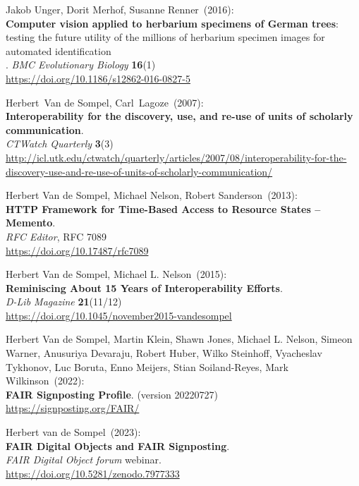 \begin{thebibliography}{9}
Jakob Unger, Dorit Merhof, Susanne Renner~(2016): \\
\textbf{Computer vision applied to herbarium specimens of German trees}: testing the future utility of the millions of herbarium specimen images for automated identification\\. 
\emph{BMC Evolutionary Biology} \textbf{16}(1)\\
\url{https://doi.org/10.1186/s12862-016-0827-5}

Herbert~Van de Sompel, Carl~Lagoze~(2007): \\
\textbf{Interoperability for the discovery, use, and re-use of units of scholarly communication}.\\
\emph{CTWatch Quarterly} \textbf{3}(3)\\
\url{http://icl.utk.edu/ctwatch/quarterly/articles/2007/08/interoperability-for-the-discovery-use-and-re-use-of-units-of-scholarly-communication/}

Herbert Van de Sompel, Michael Nelson, Robert Sanderson~(2013): \\
\textbf{{HTTP Framework} for {Time-Based Access} to {Resource States} --{Memento}}.\\
\emph{RFC Editor}, RFC 7089\\
\url{https://doi.org/10.17487/rfc7089}

Herbert Van de Sompel, Michael L. Nelson~(2015): \\
\textbf{Reminiscing About 15 Years of Interoperability Efforts}.\\
\emph{D-Lib Magazine} \textbf{21}(11/12) \\
\url{https://doi.org/10.1045/november2015-vandesompel}

Herbert Van de Sompel, Martin Klein, Shawn Jones, Michael L. Nelson, Simeon Warner, Anusuriya Devaraju, Robert Huber, Wilko Steinhoff, Vyacheslav Tykhonov, Luc Boruta, Enno Meijers, Stian Soiland-Reyes, Mark Wilkinson~(2022): \\
\textbf{FAIR Signposting Profile}. (version 20220727)\\
\url{https://signposting.org/FAIR/}

Herbert van de Sompel~(2023): \\
\textbf{FAIR Digital Objects and FAIR Signposting}.\\
\emph{FAIR Digital Object forum} webinar.\\
\url{https://doi.org/10.5281/zenodo.7977333}


\end{thebibliography}
